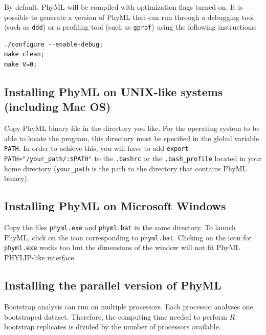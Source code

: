 \documentclass[a4paper,12pt]{article}
\newcommand{\x}[1]{\texttt{#1}}
\begin{document}
By default, PhyML will be compiled with optimization flags turned on. It is possible to generate a
version of PhyML that can run through a debugging tool (such as \x{ddd}\label{ddd}) or a profiling
tool (such as \x{gprof}\label{gprof}) using the following instructions:

{\setlength{\baselineskip}{0.5\baselineskip}
\begin{verbatim}
./configure --enable-debug;
make clean;
make V=0;
\end{verbatim}
}




\subsection{Installing PhyML on UNIX-like systems (including Mac OS)}

Copy PhyML binary file in the directory you like.  For the operating system to be able to locate the
program, this directory must be specified in the global variable \x{PATH}. In order to achieve this,
you  will   have  to  add  \x{export   PATH="/your\_path/:\${PATH}"}  to  the   \x{.bashrc}  or  the
\x{.bash\_profile} located in your home directory  (\x{your\_path} is the path to the directory that
contains PhyML binary).


\subsection{Installing PhyML on Microsoft Windows}\label{sec:install-windows}

Copy the files \x{phyml.exe} and \x{phyml.bat} in  the same directory. To launch PhyML, click on the
icon  corresponding to \x{phyml.bat}.   Clicking on  the icon  for \x{phyml.exe}  works too  but the
dimensions of the window will not fit PhyML PHYLIP-like interface.

\subsection{Installing the parallel version of PhyML}\label{sec:MPI}

Bootstrap analysis can run on multiple  processors. Each processor analyses one bootstraped dataset.
Therefore, the computing time needed to perform $R$ bootstrap replicates is divided by the number of
processors available.
\end{document}
